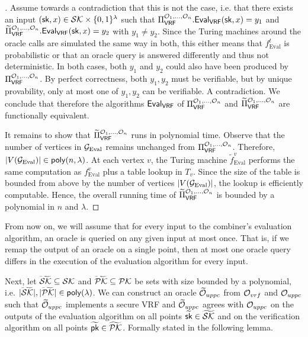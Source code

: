 \begin{proof}[]
	Assume towards a contradiction that this is not the case, i.e. that there exists an input $(\textup{\textsf{sk}}, x) \in \mathcal{SK} \times \{0,1\}^\lambda$
	such that $\BBComb{VRF}[\O_1, \ldots, \O_n].\alg{Eval}{VRF}(\sk, x) = y_1$ and $\DAGComb{VRF}[\O_1, \ldots, \O_n].\alg{Eval}{VRF}(\sk, x) = y_2$
	with $y_1 \neq y_2$. Since the Turing machines around the oracle calls are simulated the same way in both, this either means that $f^t_{\text{Eval}}$
	is probabilistic or that an oracle query is answered differently and thus not deterministic. In both cases, both $y_1$ and $y_2$ could also have been produced 
	by $\BBComb{VRF}[\O_1, \ldots, \O_n]$. By perfect correctness, both $y_1,y_2$
	must be verifiable, but by unique provability, only at most one of $y_1,y_2$ can be verifiable. A contradiction.
	We conclude that therefore the algorithms $\alg{Eval}{VRF}$ of $\BBComb{VRF}[\O_1, \ldots, \O_n]$ and $\DAGComb{VRF}[\O_1, \ldots, \O_n]$
	are functionally equivalent.

	It remains to show that $\DAGComb{VRF}[\O_1, \ldots, \O_n]$ runs in polynomial time. Observe that the number of vertices in $\mathcal{G}_{\text{Eval}}$
	remains unchanged from $\BBComb{VRF}[\O_1, \ldots, \O_n]$. Therefore, $|V(\G_{\text{Eval}})| \in \poly[n, \lambda]$. At each vertex $v$,
	the Turing machine $\widetilde f_{\text{Eval}}^v$ performs the same computation as $f_{\text{Eval}}^v$ plus a table lookup in $T_v$.
	Since the size of the table is bounded from above by the number of vertices $|V(\mathcal{G}_{\text{Eval}})|$, the lookup is efficiently computable.
	Hence, the overall running time of $\DAGComb{VRF}[\O_1, \ldots, \O_n]$ is bounded by a polynomial in $n$ and $\lambda$.
\end{proof}

From now on, we will assume that for every input to the combiner's evaluation algorithm,
an oracle is queried on any given input at most once. That is, if we remap the output of an oracle on a single point, 
then at most one oracle query differs in the execution of the evaluation algorithm for every input.

Next, let $\smash{\widetilde{\mathcal{SK}}} \subseteq \mathcal{SK}$ and $\smash{\widetilde{\mathcal{PK}}} \subseteq \mathcal{PK}$ be sets
with size bounded by a polynomial, i.e. $\abs{\tildeSK}, \abs{\tildePK} \in \poly$.
We can construct an oracle $\widetilde{\mathcal{O}}_{uppc}$ from $\mathcal{O}_{vrf}$ and $\mathcal{O}_{uppc}$ such that 
$\widetilde{\mathcal{O}}_{uppc}$ implements a secure VRF and $\widetilde{\mathcal{O}}_{uppc}$ agrees with $\mathcal{O}_{uppc}$
on the outputs of the evaluation algorithm on all points $\widetilde{\textup{\textsf{sk}}} \in \smash{\widetilde{\mathcal{SK}}}$
and on the verification algorithm on all points $\widetilde{\textup{\textsf{pk}}} \in \smash{\widetilde{\mathcal{PK}}}$.
Formally stated in the following lemma.

